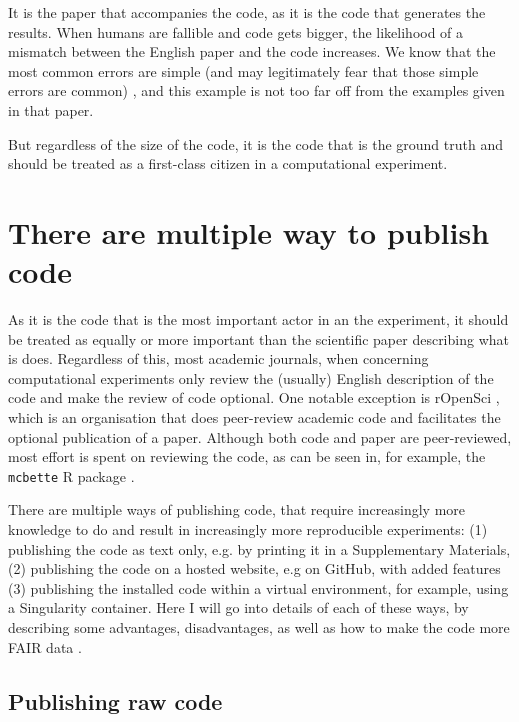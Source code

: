 It is the paper that accompanies the code,
as it is the code that generates the results.
When humans are fallible and code gets bigger, the likelihood of
a mismatch between the English paper and the code increases.
We know that the most common errors are 
simple (and may legitimately fear that those simple errors are common) 
\cite{baggerly2009deriving},
and this example is not too far off from the
examples given in that paper.

But regardless of the size of the code, 
it is the code that is the ground truth
and should be treated as a first-class citizen
in a computational experiment.

\section{There are multiple way to publish code}

As it is the code that is the most important actor in an the experiment,
it should be treated as equally or more important than the scientific
paper describing what is does.
Regardless of this, most academic journals, 
when concerning computational experiments
only review the (usually) English description of the code
and make the review of code optional.
One notable exception is rOpenSci \cite{ram2018community},
which is an organisation that does peer-review academic code 
and facilitates the optional publication of a paper.
Although both code and paper are peer-reviewed,
most effort is spent on reviewing the code,
as can be seen in, for example, 
the \verb|mcbette| R package \cite{bilderbeek2020mcbette}.

There are multiple ways of publishing code,
that require increasingly more knowledge to do and result
in increasingly more reproducible experiments:
(1) publishing the code as text only, e.g. by printing
it in a Supplementary Materials, (2) publishing
the code on a hosted website, e.g on GitHub, with
added features (3) publishing 
the installed code within a virtual environment,
for example, using a Singularity container.
Here I will go into details of each of these ways,
by describing some advantages, disadvantages, as well as how to
make the code more FAIR data \cite{wilkinson2016fair}.

\subsection{Publishing raw code}

